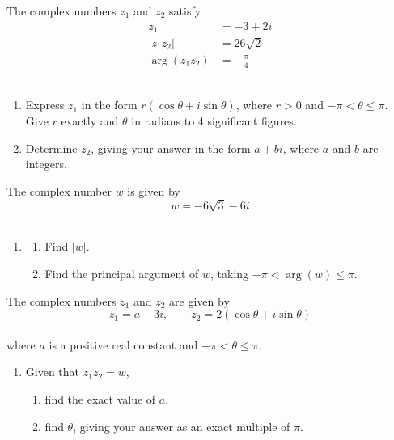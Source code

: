 \documentclass[leqno]{article}
\begin{document}
\begin{enumerate}[
  label=\textbf{\arabic*.},
  leftmargin=*,
  topsep=0pt,
  partopsep=0pt,
  parsep=0pt
]
\questionitem

The complex numbers $z_1$ and $z_2$ satisfy
\[
\begin{aligned}
z_1 &= -3+2i \\
|z_1z_2| &= 26\sqrt{2} \\
\arg(z_1z_2) &= -\frac{\pi}{4}
\end{aligned}
\] \\
\begin{enumerate}[label=\textbf{(\alph*)}]
\item Express $z_1$ in the form $r(\cos\theta+i\sin\theta)$, where $r>0$ and $-\pi<\theta\leq\pi$. \\
Give $r$ exactly and $\theta$ in radians to 4 significant figures.  \\
\item Determine $z_2$, giving your answer in the form $a+bi$, where $a$ and $b$ are integers.  \\
\end{enumerate}

\newpage

\questionitem

The complex number $w$ is given by
\[
w=-6\sqrt{3}-6i
\] \\
\begin{enumerate}[label=\textbf{(\alph*)}]
\item
\begin{enumerate}[label=(\roman*)]
\item Find $|w|$.  \\
\item Find the principal argument of $w$, taking $-\pi<\arg(w)\leq\pi$.  \\
\end{enumerate}
\end{enumerate}
The complex numbers $z_1$ and $z_2$ are given by
\[
z_1=a-3i,\qquad z_2=2(\cos\theta+i\sin\theta)
\] \\
where $a$ is a positive real constant and $-\pi<\theta\leq\pi$. \\
\begin{enumerate}[label=\textbf{(\alph*)}, resume]
\item Given that $z_1z_2=w$, \\
\begin{enumerate}[label=(\roman*)]
\item find the exact value of $a$.  \\
\item find $\theta$, giving your answer as an exact multiple of $\pi$.  \\
\end{enumerate}
\end{enumerate}


\end{enumerate}
\end{document}
